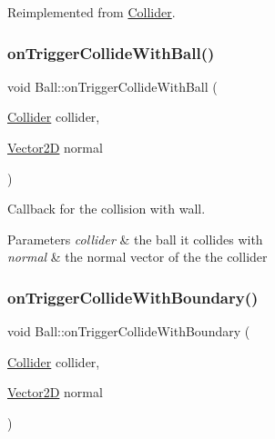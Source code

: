 Reimplemented from \mbox{\hyperlink{class_collider_ae17ec8f9110acbc4df79d5addf8ac401}{Collider}}.

\mbox{\label{class_ball_a90c9eb2d1cdbcb19bf3864992d755cfd}} 
\subsubsection{\texorpdfstring{on\+Trigger\+Collide\+With\+Ball()}{onTriggerCollideWithBall()}}
{\footnotesize\ttfamily void Ball\+::on\+Trigger\+Collide\+With\+Ball (\begin{DoxyParamCaption}\item[{\mbox{\hyperlink{class_collider}{Collider}}}]{collider,  }\item[{\mbox{\hyperlink{struct_vector2_d}{Vector2D}}}]{normal }\end{DoxyParamCaption})}



Callback for the collision with wall. 


\begin{DoxyParams}{Parameters}
{\em collider} & the ball it collides with \\
\hline
{\em normal} & the normal vector of the the collider \\
\hline
\end{DoxyParams}
\mbox{\label{class_ball_a4a9237d30bf79a0bef3068e666ffd440}} 
\subsubsection{\texorpdfstring{on\+Trigger\+Collide\+With\+Boundary()}{onTriggerCollideWithBoundary()}}
{\footnotesize\ttfamily void Ball\+::on\+Trigger\+Collide\+With\+Boundary (\begin{DoxyParamCaption}\item[{\mbox{\hyperlink{class_collider}{Collider}}}]{collider,  }\item[{\mbox{\hyperlink{struct_vector2_d}{Vector2D}}}]{normal }\end{DoxyParamCaption})}



